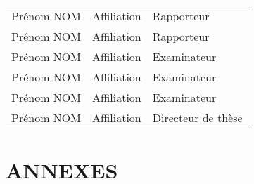 \documentclass{amu_these}
\begin{document}
\begin{tabular}{lll}
	Prénom NOM & Affiliation & Rapporteur \\
    \vspace{0.08cm}
	Prénom NOM & Affiliation & Rapporteur \\
    \vspace{0.08cm}
	Prénom NOM & Affiliation & Examinateur \\
    \vspace{0.08cm}
	Prénom NOM & Affiliation & Examinateur \\
    \vspace{0.08cm}
	Prénom NOM & Affiliation & Examinateur \\
    \vspace{0.08cm}
	Prénom NOM & Affiliation & Directeur de thèse \\
\end{tabular}
\selectfont{}

\chapter*{ANNEXES}
\renewcommand{\thesection}{\Alph{section}}

\end{document}
